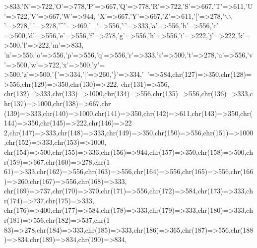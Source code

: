 \begin{DoxyCode}
{      >833,\textcolor{charliteral}{'N'}=>722,\textcolor{charliteral}{'O'}=>778,\textcolor{charliteral}{'P'}=>667,\textcolor{charliteral}{'Q'}=>778,\textcolor{charliteral}{'R'}=>722,\textcolor{charliteral}{'S'}=>667,\textcolor{charliteral}{'T'}=>611,\textcolor{charliteral}{'U'}=>722,\textcolor{charliteral}{'V'}=>667,\textcolor{charliteral}{'W'}=>944,
    \textcolor{charliteral}{'X'}=>667,\textcolor{charliteral}{'Y'}=>667,\textcolor{charliteral}{'Z'}=>611,\textcolor{charliteral}{'['}=>278,\textcolor{charliteral}{'\(\backslash\)\(\backslash\)'}=>278,\textcolor{charliteral}{']'}=>278,\textcolor{charliteral}{'^'}=>469,\textcolor{charliteral}{'\_'}=>556,\textcolor{charliteral}{'`'}=>333,\textcolor{charliteral}{'a'}=>556,\textcolor{charliteral}{'b'}=>556,\textcolor{charliteral}{'c'}
      =>500,\textcolor{charliteral}{'d'}=>556,\textcolor{charliteral}{'e'}=>556,\textcolor{charliteral}{'f'}=>278,\textcolor{charliteral}{'g'}=>556,\textcolor{charliteral}{'h'}=>556,\textcolor{charliteral}{'i'}=>222,\textcolor{charliteral}{'j'}=>222,\textcolor{charliteral}{'k'}=>500,\textcolor{charliteral}{'l'}=>222,\textcolor{charliteral}{'m'}=>833,
    \textcolor{charliteral}{'n'}=>556,\textcolor{charliteral}{'o'}=>556,\textcolor{charliteral}{'p'}=>556,\textcolor{charliteral}{'q'}=>556,\textcolor{charliteral}{'r'}=>333,\textcolor{charliteral}{'s'}=>500,\textcolor{charliteral}{'t'}=>278,\textcolor{charliteral}{'u'}=>556,\textcolor{charliteral}{'v'}=>500,\textcolor{charliteral}{'w'}=>722,\textcolor{charliteral}{'x'}=>500,\textcolor{charliteral}{'y'}=
      >500,\textcolor{charliteral}{'z'}=>500,\textcolor{charliteral}{'\{'}=>334,\textcolor{charliteral}{'|'}=>260,\textcolor{charliteral}{'\}'}=>334,\textcolor{charliteral}{'~'}=>584,chr(127)=>350,chr(128)=>556,chr(129)=>350,chr(130)=>222,
      chr(131)=>556,
    chr(132)=>333,chr(133)=>1000,chr(134)=>556,chr(135)=>556,chr(136)=>333,chr(137)=>1000,chr(138)=>667,chr
      (139)=>333,chr(140)=>1000,chr(141)=>350,chr(142)=>611,chr(143)=>350,chr(144)=>350,chr(145)=>222,chr(146)=>22
      2,chr(147)=>333,chr(148)=>333,chr(149)=>350,chr(150)=>556,chr(151)=>1000,chr(152)=>333,chr(153)=>1000,
    chr(154)=>500,chr(155)=>333,chr(156)=>944,chr(157)=>350,chr(158)=>500,chr(159)=>667,chr(160)=>278,chr(1
      61)=>333,chr(162)=>556,chr(163)=>556,chr(164)=>556,chr(165)=>556,chr(166)=>260,chr(167)=>556,chr(168)=>333,
      chr(169)=>737,chr(170)=>370,chr(171)=>556,chr(172)=>584,chr(173)=>333,chr(174)=>737,chr(175)=>333,
    chr(176)=>400,chr(177)=>584,chr(178)=>333,chr(179)=>333,chr(180)=>333,chr(181)=>556,chr(182)=>537,chr(1
      83)=>278,chr(184)=>333,chr(185)=>333,chr(186)=>365,chr(187)=>556,chr(188)=>834,chr(189)=>834,chr(190)=>834,
}
\end{DoxyCode}
